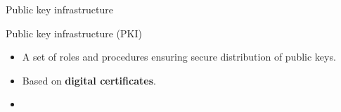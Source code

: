 \begin{frame}{Public key infrastructure}

\begin{exampleblock}{Public key infrastructure (PKI)}
\begin{itemize}
\item 
A set of roles
and procedures
ensuring
secure distribution of public keys.
\item Based on \textbf{digital certificates}.
\item {}
\end{itemize}
\end{exampleblock}


%

\end{frame}

